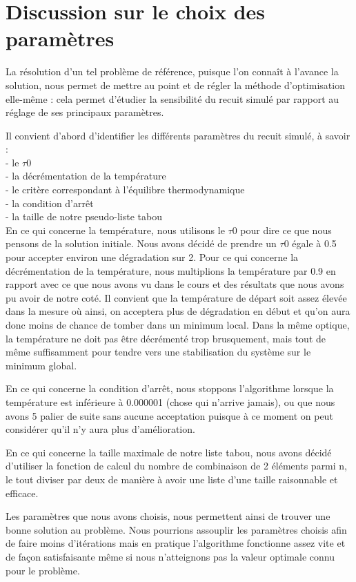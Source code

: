 \documentclass{report}
\begin{document}
\section{Discussion sur le choix des paramètres}
La résolution d'un tel problème de référence, puisque l'on connaît à l'avance la solution, nous permet de mettre au point et de régler la méthode d'optimisation elle-même : cela permet d'étudier la sensibilité du recuit simulé par rapport au réglage de ses principaux paramètres.

Il convient d'abord d'identifier les différents paramètres du recuit simulé, à savoir :\\
- le $\tau 0$\\
- la décrémentation de la température\\
- le critère correspondant à l'équilibre thermodynamique\\
- la condition d'arrêt\\
- la taille de notre pseudo-liste tabou\\

En ce qui concerne la température, nous utilisons le $\tau 0$ pour dire ce que nous pensons de la solution initiale. Nous avons décidé de prendre un $\tau 0$ égale à 0.5 pour accepter environ une dégradation sur 2. Pour ce qui concerne la décrémentation de la température, nous multiplions la température par 0.9 en rapport avec ce que nous avons vu dans le cours et des résultats que nous avons pu avoir de notre coté. Il convient que la température de départ soit assez élevée dans la mesure où ainsi, on acceptera plus de dégradation en début et qu'on aura donc moins de chance de tomber dans un minimum local. Dans la même optique, la température ne doit pas être décrémenté trop brusquement, mais tout de même suffisamment pour tendre vers une stabilisation du système sur le minimum global.

En ce qui concerne la condition d'arrêt, nous stoppons l'algorithme lorsque la température est inférieure à 0.000001 (chose qui n'arrive jamais), ou que nous avons 5 palier de suite sans aucune acceptation puisque à ce moment on peut considérer qu'il n'y aura plus d'amélioration.

En ce qui concerne la taille maximale de notre liste tabou, nous avons décidé d'utiliser la fonction de calcul du nombre de combinaison de 2 éléments parmi n, le tout diviser par deux de manière à avoir une liste d'une taille raisonnable et efficace.

Les paramètres que nous avons choisis, nous permettent ainsi de trouver une bonne solution au problème. Nous pourrions assouplir les paramètres choisis afin de faire moins d'itérations mais en pratique l'algorithme fonctionne assez vite et de façon satisfaisante même si nous n'atteignons pas la valeur optimale connu pour le problème.
\end{document}
